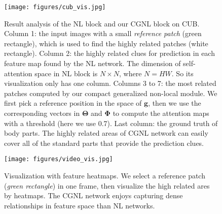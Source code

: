 \documentclass{article}
\begin{document}
%
%
\begin{figure}[ht]
\centering
\texttt{[image: figures/cub\_vis.jpg]}
\caption{\small{
  Result analysis of the NL block and our CGNL block on CUB.
  Column 1: the input images with a small \emph{reference patch} (green rectangle), which is used to find the highly related patches (white rectangle).
  Column 2: the highly related clues for prediction in each feature map found by the NL network.
  The dimension of self-attention space in NL block is $N \times N$, where $N=HW$.
  So its visualization only has one column.
  Columns 3 to 7: the most related patches computed by our compact generalized non-local module.
  We first pick a reference position in the space of $\bm{g}$, then we use the corresponding vectors in $\bm{\Theta}$ and $\bm{\Phi}$ to compute the attention maps with a threshold (here we use 0.7).
  Last column: the ground truth of body parts.
  The highly related areas of CGNL network can easily cover all of the standard parts that provide the prediction clues.
}}
\label{fig:cub visualization}
\end{figure}
%
%
\begin{figure}[ht]
\centering
\texttt{[image: figures/video\_vis.jpg]}
\caption{\small{
  Visualization with feature heatmaps. We select a reference patch (\emph{green rectangle}) in one frame, then visualize the high related ares by heatmaps. The CGNL network enjoys capturing dense relationships in feature space than NL networks.
}}
\label{fig:video visualization}
\end{figure}
%
%
%
%
\end{document}
